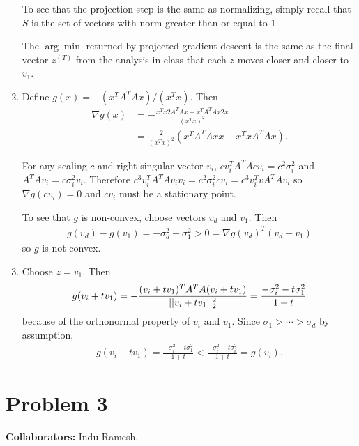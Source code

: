 \begin{enumerate}
    To see that the projection step is the same as normalizing,
    simply recall that $S$ is the set of vectors with 
    norm greater than or equal to 1.

    The $\arg \min$ returned by projected gradient descent
    is the same as the final vector $z^{(T)}$ from the 
    analysis in class that each $z$ moves closer and closer
    to $v_1$.

    \item
    Define $g(x) = -(x^T A^T A x)/ (x^T x)$.
    Then 
    \begin{align}
        \nabla g(x) &= 
        - \frac{x^Tx2A^TAx - x^T A^T A x 2x}{(x^Tx)^2}
        \nonumber \\ &=
        \frac{2}{(x^Tx)^2}\left( x^TA^TAx x - x^T x A^T A x\right).
        \nonumber
    \end{align}

    For any scaling $c$ and right singular vector
    $v_i$,
    $c v_i^TA^T A c v_i = c^2 \sigma_i^2$
    and $A^T A v_i = c \sigma_i^2 v_i$.
    Therefore $c^3 v_i^T A^T A v_i v_i = c^2 \sigma_i^2 c v_i
    = c^3 v_i^T v A^T A v_i$
    so $\nabla g(c v_i)=0$ and $cv_i$ must be a stationary point.
    
    To see that $g$ is non-convex, choose vectors $v_d$ and $v_1$.
    Then
    \begin{align}
        g(v_d) - g(v_1) = -\sigma_d^2 + \sigma_1^2  > 0
        = \nabla g(v_d)^T (v_d - v_1) \nonumber
    \end{align}
    so $g$ is not convex.

    \item
    Choose $z= v_1$.
    Then
    \begin{align}
        g(v_i + tv_1) = -\frac{(v_i+tv_1)^TA^TA(v_i+tv_1)}
        {||v_i + tv_1||_2^2} = 
        \frac{-\sigma_i^2 - t\sigma_1^2}
        {1+t}
        \nonumber
    \end{align}
    because of the orthonormal
    property of $v_i$ and $v_1$.
    Since $\sigma_1 > \cdots > \sigma_d$ by assumption,
    \begin{align}
        g(v_i + tv_1) = 
        \frac{-\sigma_i^2 - t\sigma_1^2}{1+t}
        < \frac{-\sigma_i^2 - t\sigma_i^2}{1+t}
        = g(v_i).
        \nonumber
    \end{align}

\end{enumerate}

\newpage
\section*{Problem 3}
\textbf{Collaborators:} Indu Ramesh.
\medskip

